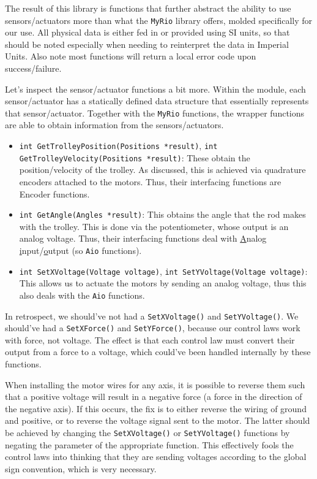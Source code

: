 \documentclass[letterpaper]{article}
\begin{document}
The result of this library is functions that further abstract the ability to use sensors/actuators more than what the \texttt{MyRio} library offers, molded specifically for our use. All physical data is either fed in or provided using SI units, so that should be noted especially when needing to reinterpret the data in Imperial Units. Also note most functions will return a local error code upon success/failure.

Let's inspect the sensor/actuator functions a bit more. Within the module, each sensor/actuator has a statically defined data structure that essentially represents that sensor/actuator. Together with the \texttt{MyRio} functions, the wrapper functions are able to obtain information from the sensors/actuators.
\begin{itemize}
    \item \texttt{int GetTrolleyPosition(Positions *result)}, \texttt{int GetTrolleyVelocity(Positions *result)}: These obtain the position/velocity of the trolley. As discussed, this is achieved via quadrature encoders attached to the motors. Thus, their interfacing functions are Encoder functions.
    \item \texttt{int GetAngle(Angles *result)}: This obtains the angle that the rod makes with the trolley. This is done via the potentiometer, whose output is an analog voltage. Thus, their interfacing functions deal with \underline{A}nalog \underline{i}nput/\underline{o}utput (so \texttt{Aio} functions).
    \item \texttt{int SetXVoltage(Voltage voltage)}, \texttt{int SetYVoltage(Voltage voltage)}: This allows us to actuate the motors by sending an analog voltage, thus this also deals with the \texttt{Aio} functions.
\end{itemize}

\begin{tcolorbox}[colframe=blue!50!black!70,title=Future Modification]
    In retrospect, we should've not had a \texttt{SetXVoltage()} and \texttt{SetYVoltage()}. We should've had a \texttt{SetXForce()} and \texttt{SetYForce()}, because our control laws work with force, not voltage. The effect is that each control law must convert their output from a force to a voltage, which could've been handled internally by these functions.
\end{tcolorbox}

\begin{tcolorbox}[colframe=red!75!black,colback=yellow!5, title=WARNING]
    When installing the motor wires for any axis, it is possible to reverse them such that a positive voltage will result in a negative force (a force in the direction of the negative axis). If this occurs, the fix is to either reverse the wiring of ground and positive, or to reverse the voltage signal sent to the motor. The latter should be achieved by changing the \texttt{SetXVoltage()} or \texttt{SetYVoltage()} functions by negating the parameter of the appropriate function. This effectively fools the control laws into thinking that they are sending voltages according to the global sign convention, which is very necessary.
\end{tcolorbox}
\end{document}
